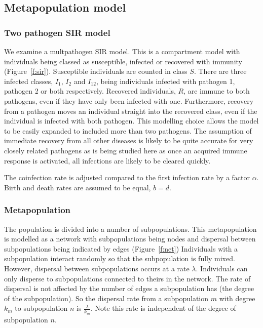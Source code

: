 \subsection{Metapopulation model}





\subsubsection{Two pathogen SIR model}

We examine a multpathogen SIR model. 
This is a compartment model with individuals being classed as susceptible, infected or recovered with immunity (Figure~\ref{f:sir}).
Susceptible individuals are counted in class $S$.
There are three infected classes, $I_1$, $I_2$ and $I_{12}$, being individuals infected with pathogen 1, pathogen 2 or both respectively.
Recovered individuals, $R$, are immune to both pathogens, even if they have only been infected with one.
Furthermore, recovery from a pathogen moves an individual straight into the recovered class, even if the individual is infected with both pathogen.
This modelling choice allows the model to be easily expanded to included more than two pathogens.
The assumption of immediate recovery from all other diseases is likely to be quite accurate for very closely related pathogens as is being studied here as once an acquired immune response is activated, all infections are likely to be cleared quickly.

The coinfection rate is adjusted compared to the first infection rate by a factor $\alpha$.
Birth and death rates are assumed to be equal, $b = d$.


\subsubsection{Metapopulation}


The population is divided into a number of subpopulations.
This metapopulation is modelled as a network with subpopulations being nodes and dispersal between subpopulations being indicated by edges (Figure~\ref{f:net})
Individuals with a subpopulation interact randomly so that the subpopulation is fully mixed.
However, dispersal between subpopulations occurs at a rate $\lambda$.
Individuals can only disperse to subpopulations connected to theirs in the network.
The rate of dispersal is not affected by the number of edges a subpopulation has (the degree of the subpopulation).
So the dispersal rate from a subpopulation $m$ with degree $k_m$ to subpopulation $n$ is $\frac{\lambda}{k_m}$.
Note this rate is independent of the degree of subpopulation $n$.





